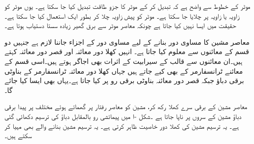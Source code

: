 موٹر کے خطوط سے واضح ہے کہ   تبدیل کر کے موٹر کا جزو طاقت تبدیل کیا جا سکتا ہے۔ یوں موٹر کو  زاویہ یا  زاویہ  پر چلایا جا سکتا ہے۔ موٹر کو پیش زاویہ چلا کر بطور ایک   استعمال کیا جا  سکتا ہے۔ حقیقت میں ایسا نہیں کیا جاتا ہے چونکہ معاصر موٹر سے برق گھیر زیادہ سستا دستیاب ہوتا ہے۔ 

معاصر مشین کا مساوی دور بنانے کے لیے مساوی دور کے اجزاء جاننا لازم ہے جنہیں دو قسم کے معائنوں سے معلوم کیا جاتا ہے۔ انہیں کھلا دور معائنہ اور قصر دور معائنہ کہتے ہیں۔ان معائنوں سے قالب کے سیرابیت کے اثرات بھی اجاگر ہوتے ہیں۔اسی قسم کے معائنے ٹرانسفارمر کے  بھی کیے جاتے ہیں جہاں  کھلا دور معائنہ ٹرانسفارمر کے بناوٹی  برقی دباؤ جبکہ قصر دور معائنہ بناوٹی  برقی رو پر کیا جاتا ہے۔یہاں بھی ایسا کیا جائے گا۔ 

معاصر مشین کے برقی سرے کھلا رکھ کر، مشین کو معاصر رفتار پر گھماتے ہوئے مختلف  پر پیدا برقی دباؤ   مشین کے سروں پر  ناپا جاتا ہے ۔شکل -ا میں پیمائشی  رو  بالمقابل دباؤ   کی  ترسیم  دکھائی گئی ہے۔ یہ ترسیم مشین کی کھلا دور خاصیت ظاہر کرتی ہے۔ یہ ترسیم مشین بنانے والے بھی مہیا کر سکتے ہیں۔

